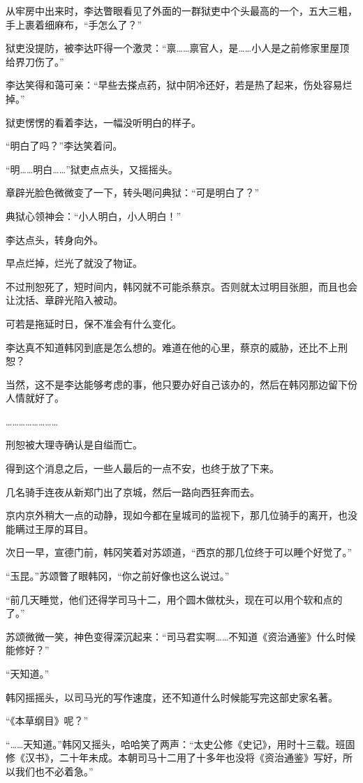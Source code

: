 从牢房中出来时，李达瞥眼看见了外面的一群狱吏中个头最高的一个，五大三粗，手上裹着细麻布，“手怎么了？”

狱吏没提防，被李达吓得一个激灵：“禀……禀官人，是……小人是之前修家里屋顶给界刀伤了。”

李达笑得和蔼可亲：“早些去搽点药，狱中阴冷还好，若是热了起来，伤处容易烂掉。”

狱吏愣愣的看着李达，一幅没听明白的样子。

“明白了吗？”李达笑着问。

“明……明白……”狱吏点点头，又摇摇头。

章辟光脸色微微变了一下，转头喝问典狱：“可是明白了？”

典狱心领神会：“小人明白，小人明白！”

李达点头，转身向外。

早点烂掉，烂光了就没了物证。

不过刑恕死了，短时间内，韩冈就不可能杀蔡京。否则就太过明目张胆，而且也会让沈括、章辟光陷入被动。

可若是拖延时日，保不准会有什么变化。

李达真不知道韩冈到底是怎么想的。难道在他的心里，蔡京的威胁，还比不上刑恕？

当然，这不是李达能够考虑的事，他只要办好自己该办的，然后在韩冈那边留下份人情就好了。

……………………

刑恕被大理寺确认是自缢而亡。

得到这个消息之后，一些人最后的一点不安，也终于放了下来。

几名骑手连夜从新郑门出了京城，然后一路向西狂奔而去。

京内京外稍大一点的动静，现如今都在皇城司的监视下，那几位骑手的离开，也没能瞒过王厚的耳目。

次日一早，宣德门前，韩冈笑着对苏颂道，“西京的那几位终于可以睡个好觉了。”

“玉昆。”苏颂瞥了眼韩冈，“你之前好像也这么说过。”

“前几天睡觉，他们还得学司马十二，用个圆木做枕头，现在可以用个软和点的了。”

苏颂微微一笑，神色变得深沉起来：“司马君实啊……不知道《资治通鉴》什么时候能修好？”

“天知道。”

韩冈摇摇头，以司马光的写作速度，还不知道什么时候能写完这部史家名著。

“《本草纲目》呢？”

“……天知道。”韩冈又摇头，哈哈笑了两声：“太史公修《史记》，用时十三载。班固修《汉书》，二十年未成。本朝司马十二用了十多年也没将《资治通鉴》写好，所以我们也不必着急。”

